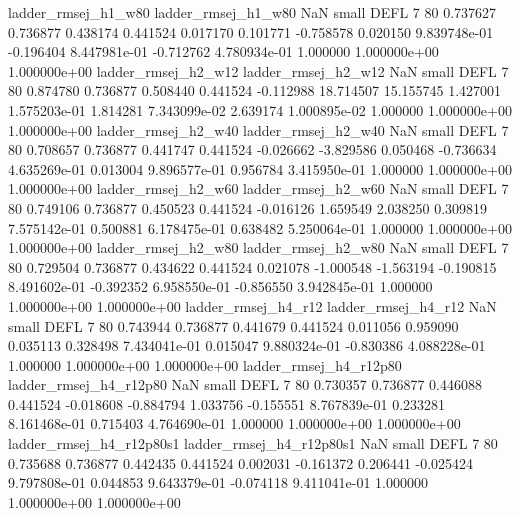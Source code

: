      ladder_rmsej_h1_w80      ladder_rmsej_h1_w80                   NaN      small     DEFL                 7 80 0.737627       0.736877 0.438174       0.441524    0.017170      0.101771     -0.758578     0.020150   9.839748e-01 -0.196404 8.447981e-01    -0.712762   4.780934e-01            1.000000    1.000000e+00        1.000000e+00
     ladder_rmsej_h2_w12      ladder_rmsej_h2_w12                   NaN      small     DEFL                 7 80 0.874780       0.736877 0.508440       0.441524   -0.112988     18.714507     15.155745     1.427001   1.575203e-01  1.814281 7.343099e-02     2.639174   1.000895e-02            1.000000    1.000000e+00        1.000000e+00
     ladder_rmsej_h2_w40      ladder_rmsej_h2_w40                   NaN      small     DEFL                 7 80 0.708657       0.736877 0.441747       0.441524   -0.026662     -3.829586      0.050468    -0.736634   4.635269e-01  0.013004 9.896577e-01     0.956784   3.415950e-01            1.000000    1.000000e+00        1.000000e+00
     ladder_rmsej_h2_w60      ladder_rmsej_h2_w60                   NaN      small     DEFL                 7 80 0.749106       0.736877 0.450523       0.441524   -0.016126      1.659549      2.038250     0.309819   7.575142e-01  0.500881 6.178475e-01     0.638482   5.250064e-01            1.000000    1.000000e+00        1.000000e+00
     ladder_rmsej_h2_w80      ladder_rmsej_h2_w80                   NaN      small     DEFL                 7 80 0.729504       0.736877 0.434622       0.441524    0.021078     -1.000548     -1.563194    -0.190815   8.491602e-01 -0.392352 6.958550e-01    -0.856550   3.942845e-01            1.000000    1.000000e+00        1.000000e+00
     ladder_rmsej_h4_r12      ladder_rmsej_h4_r12                   NaN      small     DEFL                 7 80 0.743944       0.736877 0.441679       0.441524    0.011056      0.959090      0.035113     0.328498   7.434041e-01  0.015047 9.880324e-01    -0.830386   4.088228e-01            1.000000    1.000000e+00        1.000000e+00
  ladder_rmsej_h4_r12p80   ladder_rmsej_h4_r12p80                   NaN      small     DEFL                 7 80 0.730357       0.736877 0.446088       0.441524   -0.018608     -0.884794      1.033756    -0.155551   8.767839e-01  0.233281 8.161468e-01     0.715403   4.764690e-01            1.000000    1.000000e+00        1.000000e+00
ladder_rmsej_h4_r12p80s1 ladder_rmsej_h4_r12p80s1                   NaN      small     DEFL                 7 80 0.735688       0.736877 0.442435       0.441524    0.002031     -0.161372      0.206441    -0.025424   9.797808e-01  0.044853 9.643379e-01    -0.074118   9.411041e-01            1.000000    1.000000e+00        1.000000e+00
